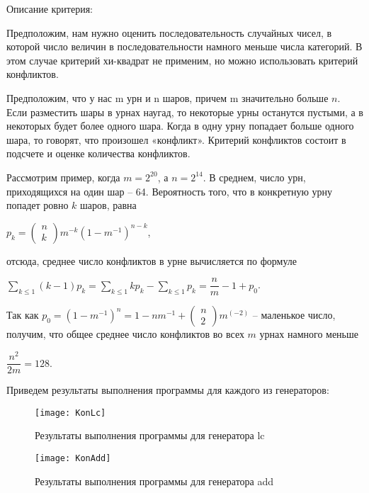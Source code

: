 \documentclass[bachelor, och, coursework]{shiza}
\begin{document}
	Описание критерия:
	
	Предположим, нам нужно оценить последовательность случайных чисел, в которой число величин в последовательности намного меньше числа категорий. В этом случае критерий хи-квадрат не применим, но можно использовать критерий конфликтов. 
	
	Предположим, что у нас m урн и n шаров, причем m значительно больше $n$. Если разместить шары в урнах наугад, то некоторые урны останутся пустыми, а в некоторых будет более одного шара. Когда в одну урну попадает больше одного шара, то говорят, что произошел «конфликт». Критерий конфликтов состоит в подсчете и оценке количества конфликтов.
	
	Рассмотрим пример, когда $m = 2^{20}$, а $n = 2^{14}$. В среднем, число урн, приходящихся на один шар – 64. Вероятность того, что в конкретную урну попадет ровно $k$ шаров, равна
	
			\begin{center}
				$p_k = \left( \substack{n\\k} \right) m^{-k} (1-m^{-1})^{n-k}$,
			\end{center}
		
	отсюда, среднее число конфликтов в урне вычисляется по формуле
	
			\begin{center}
				$\sum_{k \leq 1} (k - 1) p_k = \sum_{k \leq 1} k p_k - \sum_{k \leq 1} p_k = \dfrac{n}{m} - 1 + p_0$.
			\end{center}
	
	Так как $p_0 = (1 - m^{-1} )^n = 1-n m^{-1} + \left( \substack{n\\2} \right) m^(-2)$ – маленькое число, получим, что общее среднее число конфликтов во всех $m$ урнах намного меньше 
	
				\begin{center}
					$\dfrac{n^2}{2 m} = 128$.
				\end{center}
	
	Приведем результаты выполнения программы для каждого из генераторов:
	
	\begin{figure}[H]
		\centering
		\texttt{[image: KonLc]}
		\caption{Результаты выполнения программы для генератора lc}
		\label{fig:KonLc}
	\end{figure}
	
	\begin{figure}[H]
		\centering
		\texttt{[image: KonAdd]}
		\caption{Результаты выполнения программы для генератора add}
		\label{fig:KonAdd}
	\end{figure}
	
\end{document}
